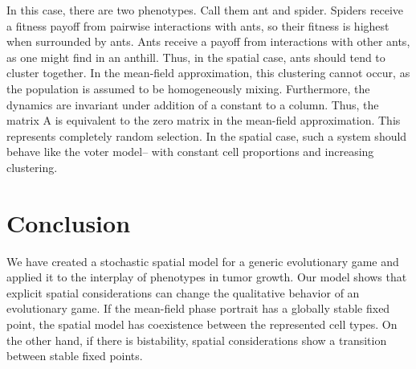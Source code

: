 \documentclass[12pt]{amsart}
\begin{document}
In this case, there are two phenotypes. Call them ant and spider. Spiders receive a fitness payoff from pairwise interactions with ants, so their fitness is highest when surrounded by ants. Ants receive a payoff from interactions with other ants, as one might find in an anthill. Thus, in the spatial case, ants should tend to cluster together. In the mean-field approximation, this clustering cannot occur, as the population is assumed to be homogeneously mixing. Furthermore, the dynamics are invariant under addition of a constant to a column. Thus, the matrix A is equivalent to the zero matrix in the mean-field approximation. This represents completely random selection. In the spatial case, such a system should behave like the voter model-- with constant cell proportions and increasing clustering.



\section{Conclusion}
We have created a stochastic spatial model for a generic evolutionary game and applied it to the interplay of phenotypes in tumor growth. Our model shows that explicit spatial considerations can change the qualitative behavior of an evolutionary game. If the mean-field phase portrait has a globally stable fixed point, the spatial model has coexistence between the represented cell types. On the other hand, if there is bistability, spatial considerations show a transition between stable fixed points. 

\pagebreak


\newpage 

\end{document}

